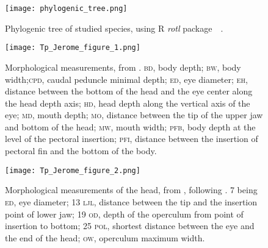 
\renewcommand\thefigure{\thesection.\arabic{figure}}
\setcounter{figure}{0}

\begin{figure} [!htbp]
	\begin{center}
		\texttt{[image: phylogenic\_tree.png]}
	\end{center}
	\caption[Petite légende]{Phylogenic tree of studied species, using R \emph{rotl} package~\citep{opentreeoflife2019}~.}
	\label{fig:phylotree}
\end{figure}



\begin{figure} [!htbp]
	\begin{center}
		\texttt{[image: Tp\_Jerome\_figure\_1.png]}
		\caption[Petite légende]{Morphological measurements, from \citet{albouy2011}. \textsc{bd}, body depth; \textsc{bw}, body width;\textsc{cpd}, caudal peduncle minimal depth; \textsc{ed}, eye diameter; \textsc{eh}, distance between the bottom of the head and the eye center along the head depth axis; \textsc{hd}, head depth along the vertical axis of the eye; \textsc{md}, mouth depth; \textsc{mo}, distance between the tip of the upper jaw and bottom of the head; \textsc{mw}, mouth width; \textsc{pfb}, body depth at the level of the pectoral insertion; \textsc{pfi}, distance between the insertion of pectoral fin and the bottom of the body.}
	\label{fig:app1}
	\end{center}
\end{figure}


\begin{figure} [!htbp]
	\begin{center}
		\texttt{[image: Tp\_Jerome\_figure\_2.png]}
		\caption[Petite légende]{Morphological measurements of the head, from \citet{diderich2006}, following \citet{sibbing2000}. 7 being \textsc{ed}, eye diameter; 13 \textsc{ljl}, distance between the tip and the insertion point of lower jaw; 19 \textsc{od}, depth of the operculum from point of insertion to bottom; 25 \textsc{pol}, shortest distance between the eye and the end of the head; \textsc{ow}, operculum maximum width.}
	\label{fig:app2}
	\end{center}
	
\end{figure}


